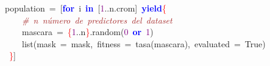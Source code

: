 \noindent
\mbox{}population\ \textcolor{BrickRed}{=}\ \textcolor{BrickRed}{[}\textbf{\textcolor{Blue}{for}}\ i\ \textbf{\textcolor{Blue}{in}}\ \textcolor{BrickRed}{[}\textcolor{Purple}{1}\textcolor{BrickRed}{..}n\textcolor{BrickRed}{.}crom\textcolor{BrickRed}{]}\ \textbf{\textcolor{Blue}{yield}}\textcolor{Red}{\{} \\
\mbox{}\ \ \ \ \textit{\textcolor{Brown}{\#\ n\ número\ de\ predictores\ del\ dataset}} \\
\mbox{}\ \ \ \ mascara\ \textcolor{BrickRed}{=}\ \textcolor{Red}{\{}\textcolor{Purple}{1}\textcolor{BrickRed}{..}n\textcolor{Red}{\}}\textcolor{BrickRed}{.}random\textcolor{BrickRed}{(}\textcolor{Purple}{0}\ \textbf{\textcolor{Blue}{or}}\ \textcolor{Purple}{1}\textcolor{BrickRed}{)} \\
\mbox{}\ \ \ \ list\textcolor{BrickRed}{(}mask\ \textcolor{BrickRed}{=}\ mask\textcolor{BrickRed}{,}\ fitness\ \textcolor{BrickRed}{=}\ tasa\textcolor{BrickRed}{(}mascara\textcolor{BrickRed}{),}\ evaluated\ \textcolor{BrickRed}{=}\ True\textcolor{BrickRed}{)} \\
\mbox{}\ \textcolor{Red}{\}}\textcolor{BrickRed}{]} \\
\mbox{}
